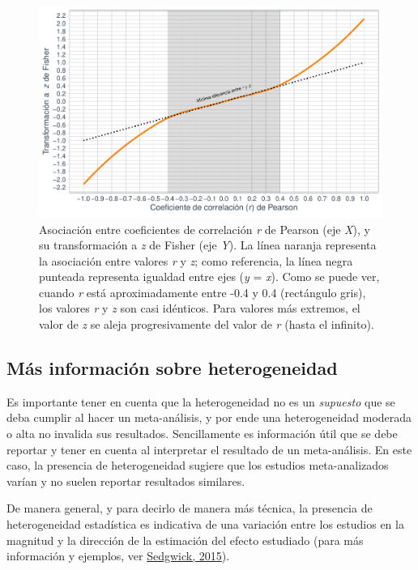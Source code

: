 \documentclass[
  bookmarksnumbered]{article}
\begin{document}
\begin{figure}
\centering
\includegraphics{Meta-analysis_files/figure-latex/rvsz-1.pdf}
\caption{\label{fig:rvsz}Asociación entre coeficientes de correlación \emph{r} de Pearson (eje \emph{X}), y su transformación a \emph{z} de Fisher (eje \emph{Y}). La línea naranja representa la asociación entre valores \emph{r} y \emph{z}; como referencia, la línea negra punteada representa igualdad entre ejes (\emph{y} = \emph{x}). Como se puede ver, cuando \emph{r} está aproximadamente entre -0.4 y 0.4 (rectángulo gris), los valores \emph{r} y \emph{z} son casi idénticos. Para valores más extremos, el valor de \emph{z} se aleja progresivamente del valor de \emph{r} (hasta el infinito).}
\end{figure}

\hypertarget{muxe1s-informaciuxf3n-sobre-heterogeneidad}{%
\subsection{Más información sobre heterogeneidad}\label{muxe1s-informaciuxf3n-sobre-heterogeneidad}}

Es importante tener en cuenta que la heterogeneidad no es un \emph{supuesto} que se deba cumplir al hacer un meta-análisis, y por ende una heterogeneidad moderada o alta no invalida sus resultados. Sencillamente es información útil que se debe reportar y tener en cuenta al interpretar el resultado de un meta-análisis. En este caso, la presencia de heterogeneidad sugiere que los estudios meta-analizados varían y no suelen reportar resultados similares.

De manera general, y para decirlo de manera más técnica, la presencia de heterogeneidad estadística es indicativa de una variación entre los estudios en la magnitud y la dirección de la estimación del efecto estudiado (para más información y ejemplos, ver \protect\hyperlink{ref-sedgwickMetaanalysesWhatHeterogeneity2015}{Sedgwick, 2015}).
\end{document}
